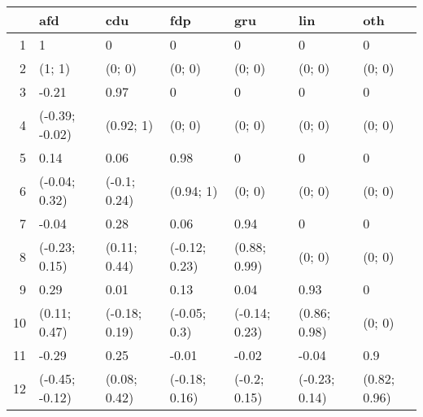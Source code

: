 \begin{table}[ht]
\centering
\begin{tabular}{rllllll}
  \hline
 & afd & cdu & fdp & gru & lin & oth \\ 
  \hline
1 & 1 & 0 & 0 & 0 & 0 & 0 \\ 
  2 & (1; 1) & (0; 0) & (0; 0) & (0; 0) & (0; 0) & (0; 0) \\ 
  3 & -0.21 & 0.97 & 0 & 0 & 0 & 0 \\ 
  4 & (-0.39; -0.02) & (0.92; 1) & (0; 0) & (0; 0) & (0; 0) & (0; 0) \\ 
  5 & 0.14 & 0.06 & 0.98 & 0 & 0 & 0 \\ 
  6 & (-0.04; 0.32) & (-0.1; 0.24) & (0.94; 1) & (0; 0) & (0; 0) & (0; 0) \\ 
  7 & -0.04 & 0.28 & 0.06 & 0.94 & 0 & 0 \\ 
  8 & (-0.23; 0.15) & (0.11; 0.44) & (-0.12; 0.23) & (0.88; 0.99) & (0; 0) & (0; 0) \\ 
  9 & 0.29 & 0.01 & 0.13 & 0.04 & 0.93 & 0 \\ 
  10 & (0.11; 0.47) & (-0.18; 0.19) & (-0.05; 0.3) & (-0.14; 0.23) & (0.86; 0.98) & (0; 0) \\ 
  11 & -0.29 & 0.25 & -0.01 & -0.02 & -0.04 & 0.9 \\ 
  12 & (-0.45; -0.12) & (0.08; 0.42) & (-0.18; 0.16) & (-0.2; 0.15) & (-0.23; 0.14) & (0.82; 0.96) \\ 
   \hline
\end{tabular}
\end{table}
